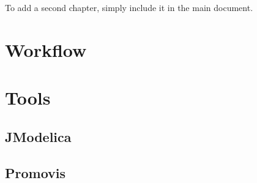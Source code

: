 To add a second chapter, simply include it in the main document.

\section{Workflow}
\section{Tools}
\subsection{JModelica}
\subsection{Promovis}